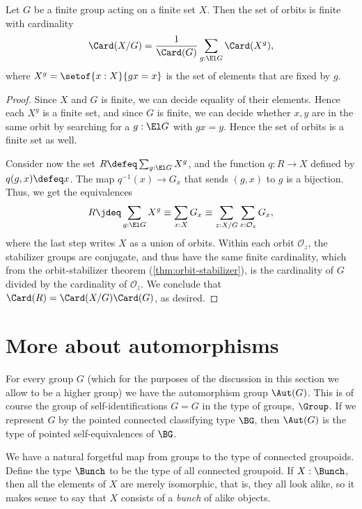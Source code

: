\begin{lemma}
  \label{lem:burnside}
  Let $G$ be a finite group acting on a finite set $X$.
  Then the set of orbits is finite with cardinality
  \[
    \Card(X/G) = \frac1{\Card(G)}\sum_{g:\El G}\Card(X^g),
  \]
  where $X^g = \setof{x:X}{gx=x}$ is the set of elements
  that are fixed by $g$.
\end{lemma}
\begin{proof}
  Since $X$ and $G$ is finite, we can decide equality of their elements.
  Hence each $X^g$ is a finite set, and since $G$ is finite,
  we can decide whether $x,y$ are in the same orbit by searching
  for a $g : \El G$ with $gx = y$.
  Hence the set of orbits is a finite set as well.

  Consider now the set $R \defeq \sum_{g:\El G} X^g$,
  and the function $q : R \to X$
  defined by $q(g,x) \defeq x$.
  The map $q^{-1}(x) \to G_x$ that sends $(g,x)$ to $g$ is a bijection.
  Thus, we get the equivalences
  \[
    R \jdeq \sum_{g:\El G} X^g \equiv \sum_{x:X} G_x
    \equiv \sum_{z:X/G} \sum_{x : \mathcal O_z} G_x,
  \]
  where the last step writes $X$ as a union of orbits.
  Within each orbit $\mathcal O_z$,
  the stabilizer groups are conjugate,
  and thus have the same finite cardinality,
  which from the orbit-stabilizer theorem (\cref{thm:orbit-stabilizer}),
  is the cardinality of $G$ divided by the cardinality of $\mathcal O_z$.
  We conclude that $\Card(R) = \Card(X/G)\Card(G)$, as desired.
\end{proof}

\section{More about automorphisms}
\label{sec:automorphisms}

For every group $G$ (which for the purposes of the discussion
in this section we allow to be a higher group)
we have the automorphism group $\Aut(G)$.
This is of course the group of self-identifications $G = G$ in the type of groups, $\Group$.
If we represent $G$ by the pointed connected classifying type $\BG$,
then $\Aut(G)$ is the type of pointed self-equivalences of $\BG$.

We have a natural forgetful map from groups to the type of connected groupoids.
Define the type $\Bunch$ to be the type of all connected groupoid.
If $X:\Bunch$, then all the elements of $X$ are merely isomorphic,
that is, they all look alike,
so it makes sense to say that $X$ consists of a \emph{bunch} of alike objects.

